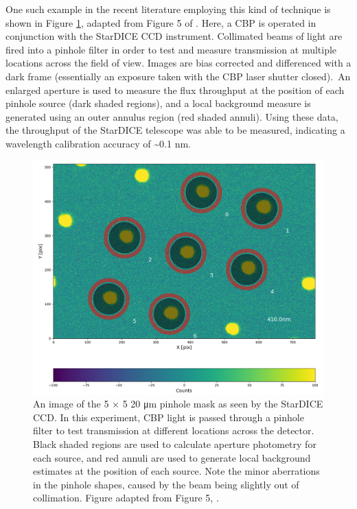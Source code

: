 \documentclass[SE,authoryear,toc]{lsstdoc}
\begin{document}
One such example in the recent literature employing this kind of technique is shown in Figure \ref{fig:cbp_pinhole_mondrik2023}, adapted from Figure 5 of \citet{Mondrik2023} \citep[see also][]{Coughlin2016}.
Here, a CBP is operated in conjunction with the StarDICE CCD instrument.
Collimated beams of light are fired into a pinhole filter in order to test and measure transmission at multiple locations across the field of view.
Images are bias corrected and differenced with a dark frame (essentially an exposure taken with the CBP laser shutter closed).\
An enlarged aperture is used to measure the flux throughput at the position of each pinhole source (dark shaded regions), and a local background measure is generated using an outer annulus region (red shaded annuli).
Using these data, the throughput of the StarDICE telescope was able to be measured, indicating a wavelength calibration accuracy of \sim 0.1 nm.

\begin{figure}
\centering
\includegraphics[height=0.75\textwidth]{fig/cbp_pinhole_mondrik2023}
\caption{
An image of the 5 × 5 20 μm pinhole mask as seen by the StarDICE CCD.
In this experiment, CBP light is passed through a pinhole filter to test transmission at different locations across the detector.
Black shaded regions are used to calculate aperture photometry for each source, and red annuli are used to generate local background estimates at the position of each source.
Note the minor aberrations in the pinhole shapes, caused by the beam being slightly out of collimation.
Figure adapted from Figure 5, \citet{Mondrik2023}.
}
\label{fig:cbp_pinhole_mondrik2023}
\end{figure}
\end{document}
